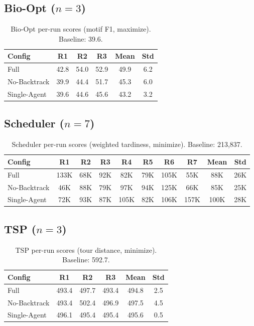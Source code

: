\documentclass{article}
\begin{document}
\subsection{Bio-Opt ($n{=}3$)}

\begin{table}[h]
\centering
\caption{Bio-Opt per-run scores (motif F1, maximize). Baseline: 39.6.}
\label{tab:bioopt_runs}
\small
\begin{tabular}{@{}lccc|cc@{}}
\toprule
\textbf{Config} & \textbf{R1} & \textbf{R2} & \textbf{R3} & \textbf{Mean} & \textbf{Std} \\
\midrule
Full          & 42.8  & 54.0  & 52.9  & 49.9  & 6.2  \\
No-Backtrack  & 39.9  & 44.4  & 51.7  & 45.3  & 6.0  \\
Single-Agent  & 39.6  & 44.6  & 45.6  & 43.2  & 3.2  \\
\bottomrule
\end{tabular}
\end{table}

\subsection{Scheduler ($n{=}7$)}

\begin{table}[h]
\centering
\caption{Scheduler per-run scores (weighted tardiness, minimize). Baseline: 213{,}837.}
\label{tab:sched_runs}
\small
\begin{tabular}{@{}lccccccc|cc@{}}
\toprule
\textbf{Config} & \textbf{R1} & \textbf{R2} & \textbf{R3} & \textbf{R4} & \textbf{R5} & \textbf{R6} & \textbf{R7} & \textbf{Mean} & \textbf{Std} \\
\midrule
Full          & 133K & 68K  & 92K  & 82K  & 79K  & 105K & 55K  & 88K  & 26K \\
No-Backtrack  & 46K  & 88K  & 79K  & 97K  & 94K  & 125K & 66K  & 85K  & 25K \\
Single-Agent  & 72K  & 93K  & 87K  & 105K & 82K  & 106K & 157K & 100K & 28K \\
\bottomrule
\end{tabular}
\end{table}

\subsection{TSP ($n{=}3$)}

\begin{table}[h]
\centering
\caption{TSP per-run scores (tour distance, minimize). Baseline: 592.7.}
\label{tab:tsp_runs}
\small
\begin{tabular}{@{}lccc|cc@{}}
\toprule
\textbf{Config} & \textbf{R1} & \textbf{R2} & \textbf{R3} & \textbf{Mean} & \textbf{Std} \\
\midrule
Full          & 493.4 & 497.7 & 493.4 & 494.8 & 2.5  \\
No-Backtrack  & 493.4 & 502.4 & 496.9 & 497.5 & 4.5  \\
Single-Agent  & 496.1 & 495.4 & 495.4 & 495.6 & 0.5  \\
\bottomrule
\end{tabular}
\end{table}
\end{document}
